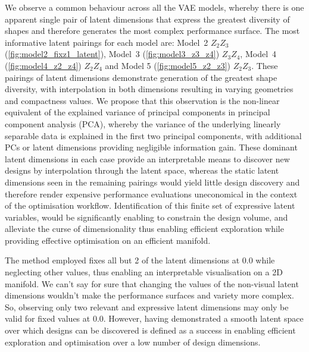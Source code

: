 \documentclass{article}
\begin{document}
We observe a common behaviour across all the VAE models, whereby there is one apparent single pair of latent dimensions that express the greatest diversity of shapes and therefore generates the most complex performance surface. The most informative latent pairings for each model are: Model~2 $Z_2 Z_3$ (\ref{fig:model2_fixz1_latent}), Model~3 (\ref{fig:model3_z3_z4}) $Z_3 Z_4$, Model~4 (\ref{fig:model4_z2_z4}) $Z_2Z_4$ and Model 5 (\ref{fig:model5_z2_z3}) $Z_2Z_3$. These pairings of latent dimensions demonstrate generation of the greatest shape diversity, with interpolation in both dimensions resulting in varying geometries and compactness values. We propose that this observation is the non-linear equivalent of the explained variance of principal components in principal component analysis (PCA), whereby the variance of the underlying linearly separable data is explained in the first two principal components, with additional PCs or latent dimensions providing negligible information gain. These dominant latent dimensions in each case provide an interpretable means to discover new designs by interpolation through the latent space, whereas the static latent dimensions seen in the remaining pairings would yield little design discovery and therefore render expensive performance evaluations uneconomical in the context of the optimisation workflow. Identification of this finite set of expressive latent variables, would be significantly enabling to constrain the design volume, and alleviate the curse of dimensionality thus enabling efficient exploration while providing effective optimisation on an efficient manifold.

The method employed fixes all but 2 of the latent dimensions at 0.0 while neglecting other values, thus enabling an interpretable visualisation on a 2D manifold. We can’t say for sure that changing the values of the non-visual latent dimensions wouldn’t make the performance surfaces and variety more complex. So, observing only two relevant and expressive latent dimensions may only be valid for fixed values at 0.0. However, having demonstrated a smooth latent space over which designs can be discovered is defined as a success in enabling efficient exploration and optimisation over a low number of design dimensions.
\end{document}
